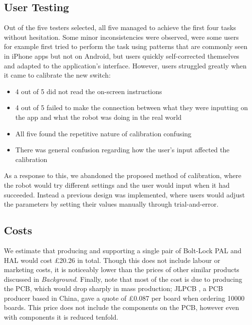 \documentclass[onecolumn]{IEEEtran}
\begin{document}
{    \subsection{User Testing}
        {Out of the five testers selected, all five managed to achieve the first four tasks without hesitation. Some minor inconsistencies were observed, were some users for example first tried to perform the task using patterns that are commonly seen in iPhone apps but not on Android, but users quickly self-corrected themselves and adapted to the application’s interface. However, users struggled greatly when it came to calibrate the new switch:}
            \begin{itemize}
                \item {4 out of 5 did not read the on-screen instructions}
                \item {4 out of 5 failed to make the connection between what they were inputting on the app and what the robot was doing in the real world}
                \item {All five found the repetitive nature of calibration confusing}
                \item {There was general confusion regarding how the user’s input affected the calibration}
            \end{itemize}
        {As a response to this, we abandoned the proposed method of calibration, where the robot would try different settings and the user would input when it had succeeded. Instead a previous design was implemented, where users would adjust the parameters by setting their values manually through trial-and-error.}
        
    \subsection{Costs}
        {We estimate that producing and supporting a single pair of Bolt-Lock PAL and HAL would cost £20.26 in total. Though this does not include labour or marketing costs, it is noticeably lower than the prices of other similar products discussed in \textit{Background}. Finally, note that most of the cost is due to producing the PCB, which would drop sharply in mass production; JLPCB \cite{jlpcb}, a PCB producer based in China, gave a quote of £0.087 per board when ordering 10000 boards. This price does not include the components on the PCB, however even with components it is reduced tenfold.}
    
}
\end{document}
